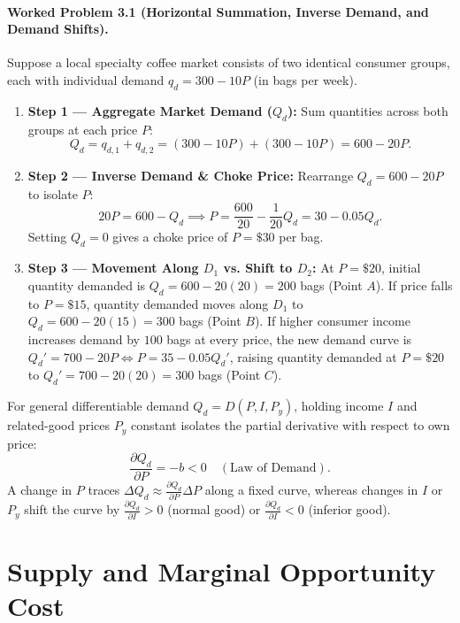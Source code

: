 \documentclass[11pt,letterpaper]{article}
\begin{document}
\paragraph{Worked Problem 3.1 (Horizontal Summation, Inverse Demand, and Demand Shifts).}
Suppose a local specialty coffee market consists of two identical consumer groups, each with individual demand $q_d = 300 - 10P$ (in bags per week).
\begin{enumerate}
  \item \textbf{Step 1 — Aggregate Market Demand ($Q_d$):} Sum quantities across both groups at each price $P$:
  $$Q_d = q_{d,1} + q_{d,2} = (300 - 10P) + (300 - 10P) = 600 - 20P.$$
  \item \textbf{Step 2 — Inverse Demand \& Choke Price:} Rearrange $Q_d = 600 - 20P$ to isolate $P$:
  $$20P = 600 - Q_d \implies P = \frac{600}{20} - \frac{1}{20}Q_d = 30 - 0.05Q_d.$$
  Setting $Q_d = 0$ gives a choke price of $P = \$30$ per bag.
  \item \textbf{Step 3 — Movement Along $D_1$ vs. Shift to $D_2$:} At $P = \$20$, initial quantity demanded is $Q_d = 600 - 20(20) = 200$ bags (Point $A$). If price falls to $P = \$15$, quantity demanded moves along $D_1$ to $Q_d = 600 - 20(15) = 300$ bags (Point $B$). If higher consumer income increases demand by $100$ bags at every price, the new demand curve is $Q_d' = 700 - 20P \iff P = 35 - 0.05Q_d'$, raising quantity demanded at $P = \$20$ to $Q_d' = 700 - 20(20) = 300$ bags (Point $C$).
\end{enumerate}

\begin{coreprinciple}
For general differentiable demand $Q_d = D(P, I, P_y)$, holding income $I$ and related-good prices $P_y$ constant isolates the partial derivative with respect to own price:
$$\frac{\partial Q_d}{\partial P} = -b < 0 \quad (\text{Law of Demand}).$$
A change in $P$ traces $\Delta Q_d \approx \frac{\partial Q_d}{\partial P}\Delta P$ along a fixed curve, whereas changes in $I$ or $P_y$ shift the curve by $\frac{\partial Q_d}{\partial I} > 0$ (normal good) or $\frac{\partial Q_d}{\partial I} < 0$ (inferior good).
\end{coreprinciple}

\section{Supply and Marginal Opportunity Cost}
\end{document}
